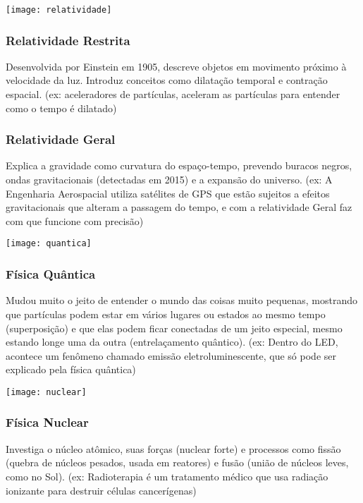 \documentclass[portuguese,11pt,a4paper,oneside,openany,notitlepage]{article}
\begin{document}
	\begin{center}
		\texttt{[image: relatividade]}
	\end{center}
	
	\subsubsection{Relatividade Restrita}
	Desenvolvida por Einstein em 1905, descreve objetos em movimento próximo à velocidade da luz. Introduz conceitos como dilatação temporal e contração espacial. \newline (ex: aceleradores de partículas, aceleram as partículas para entender como o tempo é dilatado)
	
	\subsubsection{Relatividade Geral}
	Explica a gravidade como curvatura do espaço-tempo, prevendo buracos negros, ondas gravitacionais (detectadas em 2015) e a expansão do universo. \newline (ex: A Engenharia Aerospacial utiliza satélites de GPS que estão sujeitos a efeitos gravitacionais que alteram a passagem do tempo, e com a relatividade Geral faz com que funcione com precisão)
	
	\begin{center}
		\texttt{[image: quantica]}
	\end{center}
	
	\subsubsection{Física Quântica}
	Mudou muito o jeito de entender o mundo das coisas muito pequenas, mostrando que partículas podem estar em vários lugares ou estados ao mesmo tempo (superposição) e que elas podem ficar conectadas de um jeito especial, mesmo estando longe uma da outra (entrelaçamento quântico). \newline (ex: Dentro do LED, acontece um fenômeno chamado emissão eletroluminescente, que só pode ser explicado pela física quântica)
	
	\begin{center}
		\texttt{[image: nuclear]}
	\end{center}
	
	\subsubsection{Física Nuclear}
	Investiga o núcleo atômico, suas forças (nuclear forte) e processos como fissão (quebra de núcleos pesados, usada em reatores) e fusão (união de núcleos leves, como no Sol).  \newline (ex: Radioterapia é um tratamento médico que usa radiação ionizante para destruir células cancerígenas)
	
\end{document}
